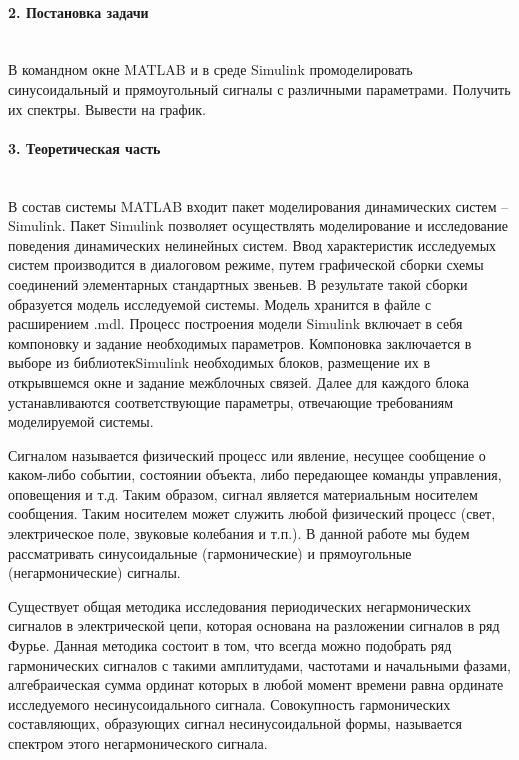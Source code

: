 \documentclass[12pt,a4paper]{report}
\begin{document}
\paragraph{2. Постановка задачи\\\\}
В командном окне MATLAB и в среде Simulink промоделировать синусоидальный и прямоугольный сигналы с различными параметрами. Получить их спектры. Вывести на график.
\paragraph{3. Теоретическая часть\\\\}
В состав системы MATLAB входит пакет моделирования динамических систем – Simulink. Пакет Simulink позволяет осуществлять моделирование и исследование поведения динамических нелинейных систем. Ввод характеристик исследуемых систем производится в диалоговом режиме, путем графической сборки схемы соединений элементарных стандартных звеньев. В результате такой сборки образуется модель исследуемой системы. Модель хранится в файле с расширением .mdl.
Процесс построения модели Simulink включает в себя компоновку и задание необходимых параметров. Компоновка заключается в выборе из библиотекSimulink необходимых блоков, размещение их в открывшемся окне и задание межблочных связей. Далее для каждого блока устанавливаются соответствующие параметры, отвечающие требованиям моделируемой системы.

Сигналом называется физический процесс или явление, несущее сообщение о каком-либо событии, состоянии объекта, либо передающее команды управления, оповещения и т.д. Таким образом, сигнал является материальным носителем сообщения. Таким носителем может служить любой физический процесс (свет, электрическое поле, звуковые колебания и т.п.). В данной работе мы будем рассматривать синусоидальные (гармонические) и прямоугольные (негармонические) сигналы.

Существует общая методика исследования периодических негармонических сигналов в электрической цепи, которая основана на разложении сигналов в ряд Фурье. Данная методика состоит в том, что всегда можно подобрать ряд гармонических сигналов с такими амплитудами, частотами и начальными фазами, алгебраическая сумма ординат которых в любой момент времени равна ординате исследуемого несинусоидального сигнала. Совокупность гармонических составляющих, образующих сигнал несинусоидальной формы, называется спектром этого негармонического сигнала.
\end{document}
